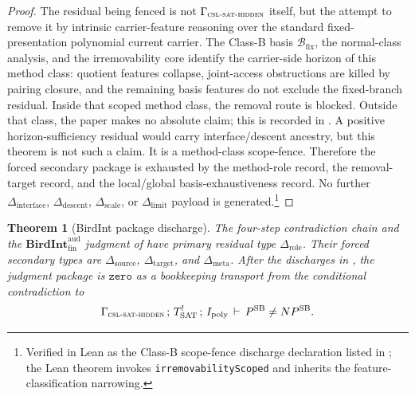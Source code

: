 \documentclass[11pt]{article}
\newcommand{\Tsat}{T^{!}_{\mathrm{SAT}}}
\newcommand{\Ipoly}{I_{\mathrm{poly}}}
\newcommand{\CSLSATHidden}{\Gamma_{\textsc{csl-sat-hidden}}}
\newcommand{\BIJudgment}[4]{#1\,;\,#2\,;\,#3\,\vdash\,#4}
\newcommand{\PSB}{P^{\mathrm{SB}}}
\newcommand{\NPSB}{NP^{\mathrm{SB}}}
\newcommand{\BirdInt}{\mathbf{BirdInt}^{\mathrm{aud}}_{\mathrm{fin}}}
\newtheorem{theorem}{Theorem}[section]
\theoremstyle{definition}
\begin{document}
\begin{proof}
The residual being fenced is not \(\CSLSATHidden\) itself, but the
attempt to remove it by intrinsic carrier-feature reasoning over the
standard fixed-presentation polynomial current carrier.  The Class-B
basis \(\mathcal B_{\mathrm{fix}}\), the normal-class analysis, and
the irremovability core identify the carrier-side horizon of this
method class: quotient features collapse, joint-access obstructions
are killed by pairing closure, and the remaining basis features do
not exclude the fixed-branch residual.  Inside that scoped method
class, the removal route is blocked.  Outside that class, the paper
makes no absolute claim; this is recorded in
.  A positive
horizon-sufficiency residual would carry interface/descent ancestry,
but this theorem is not such a claim.  It is a method-class
scope-fence.  Therefore the forced secondary package is exhausted by
the method-role record, the removal-target record, and the
local/global basis-exhaustiveness record.  No further
\(\Delta_{\mathrm{interface}}\), \(\Delta_{\mathrm{descent}}\),
\(\Delta_{\mathrm{scale}}\), or \(\Delta_{\mathrm{limit}}\) payload is
generated.\footnote{Verified in Lean as
the Class-B scope-fence discharge declaration listed in
; the Lean theorem invokes
\texttt{irremovabilityScoped} and inherits the feature-classification
narrowing.}
\end{proof}

\begin{theorem}[BirdInt package discharge]
\label{thm:pvnp:aor:judgment-package}
The four-step contradiction chain and the \(\BirdInt\) judgment of
 have primary residual type
\(\Delta_{\mathrm{role}}\).  Their forced secondary types are
\(\Delta_{\mathrm{source}}\), \(\Delta_{\mathrm{target}}\), and
\(\Delta_{\mathrm{meta}}\).  After the discharges in
, the judgment package is
\(\texttt{zero}\) as a bookkeeping transport from the conditional
contradiction to
\[
  \BIJudgment{\CSLSATHidden}{\Tsat}{\Ipoly}{\PSB\neq\NPSB}.
\]
\end{theorem}
\end{document}
